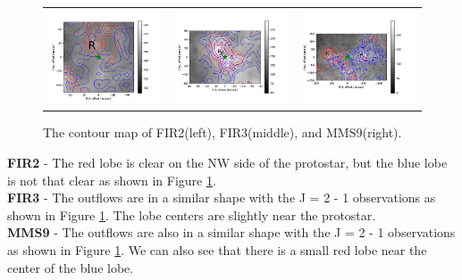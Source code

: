 \begin{figure}[h!]
	\begin{tabular}{ccc}
		\includegraphics[width = 5cm]{Orion_12CO_NRO_HOPS68_rbcontour_400} & 
		\includegraphics[width = 5cm]{Orion_12CO_NRO_HOPS370_rbcontour_400} & 
		\includegraphics[width = 5cm]{Orion_12CO_NRO_HOPS78_rbcontour_400}
		\label{10}
	\end{tabular}
	\caption{The contour map of FIR2(left), FIR3(middle), and MMS9(right). }
\end{figure}

 
\noindent \textbf{FIR2} - The red lobe is clear on the NW side of the protostar, but the blue lobe is not that clear as shown in Figure \ref{10}.\\
\textbf{FIR3} - The outflows are in a similar shape with the J = 2 - 1 observations as shown in Figure \ref{10}. The lobe centers are slightly near the protostar.\\
\textbf{MMS9} - The outflows are also in a similar shape with the J = 2 - 1 observations as shown in Figure \ref{10}. We can also see that there is a small red lobe near the center of the blue lobe.\\
\newpage

